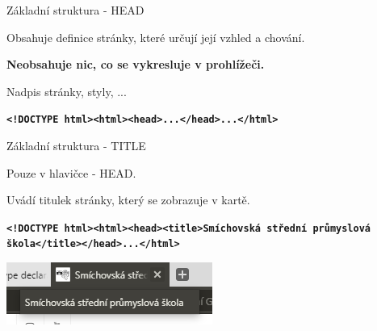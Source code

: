 \documentclass[aspectratio=169]{beamer}
\begin{document}
\begin{frame}{Základní struktura - HEAD}
    \begin{cardTiny}
        \begin{flushleft}
            Obsahuje definice stránky, které určují její vzhled a chování.

            \textbf{Neobsahuje nic, co se vykresluje v prohlížeči.}

            Nadpis stránky, styly, ...
        \end{flushleft}
    \end{cardTiny}
    \begin{cardTiny}
        \begin{flushleft}
        \texttt{\textbf{<!DOCTYPE html><html><head>...</head>...</html>}}
        \end{flushleft}
    \end{cardTiny}
\end{frame}

\begin{frame}{Základní struktura - TITLE}
    \begin{cardTiny}
        \begin{flushleft}
            Pouze v hlavičce - HEAD.

            Uvádí titulek stránky, který se zobrazuje v kartě.
        \end{flushleft}
    \end{cardTiny}
    \begin{cardTiny}
        \begin{flushleft}
        \texttt{\textbf{<!DOCTYPE html><html><head><title>Smíchovská střední průmyslová škola</title></head>...</html>}}
        \end{flushleft}
    \end{cardTiny}
\end{frame}

\begin{frame}
    \begin{center}
        \includegraphics[width=\textwidth]{img/tab-ssps.png}
    \end{center}
\end{frame}
\end{document}

